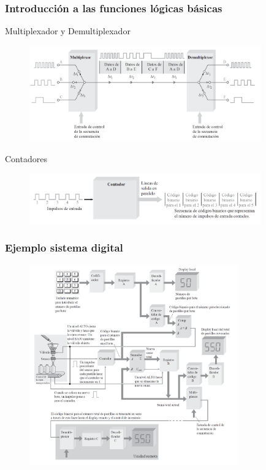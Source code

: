 \documentclass[10.5pt,scale=1.0,t,aspectratio=169,hyperref={pdfpagelabels=false}]{beamer}
\begin{document}
\begin{frame}
	\frametitle{Introducción a las funciones lógicas básicas}
		\begin{block}{\small Multiplexador y Demultiplexador}
	\justifying
	\vspace{-0.1in}
	\begin{figure}
		\centering
		\includegraphics[width=10cm]{MultiplexadorAndDemultiplexador}
	\end{figure}
\end{block}

\begin{block}{\small Contadores}
	\justifying
	\vspace{-0.1in}
	\begin{figure}
		\centering
		\includegraphics[width=10cm]{Contadores}
	\end{figure}
\end{block}
\end{frame}

\begin{frame}
	\frametitle{Ejemplo sistema digital}
	\vspace{-0.1in}
\begin{figure}
	\centering
	\includegraphics[width=9cm]{EjemploSistemaDigital}
\end{figure}
\end{frame}
\end{document}

